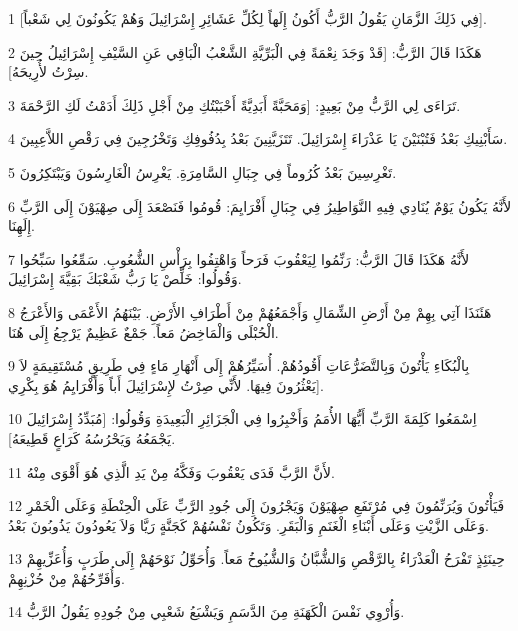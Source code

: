 \par 1 [فِي ذَلِكَ الزَّمَانِ يَقُولُ الرَّبُّ أَكُونُ إِلَهاً لِكُلِّ عَشَائِرِ إِسْرَائِيلَ وَهُمْ يَكُونُونَ لِي شَعْباً].
\par 2 هَكَذَا قَالَ الرَّبُّ: [قَدْ وَجَدَ نِعْمَةً فِي الْبَرِّيَّةِ الشَّعْبُ الْبَاقِي عَنِ السَّيْفِ إِسْرَائِيلُ حِينَ سِرْتُ لأُرِيحَهُ].
\par 3 تَرَاءَى لِي الرَّبُّ مِنْ بَعِيدٍ: [وَمَحَبَّةً أَبَدِيَّةً أَحْبَبْتُكِ مِنْ أَجْلِ ذَلِكَ أَدَمْتُ لَكِ الرَّحْمَةَ.
\par 4 سَأَبْنِيكِ بَعْدُ فَتُبْنَيْنَ يَا عَذْرَاءَ إِسْرَائِيلَ. تَتَزَيَّنِينَ بَعْدُ بِدُفُوفِكِ وَتَخْرُجِينَ فِي رَقْصِ اللاَّعِبِينَ.
\par 5 تَغْرِسِينَ بَعْدُ كُرُوماً فِي جِبَالِ السَّامِرَةِ. يَغْرِسُ الْغَارِسُونَ وَيَبْتَكِرُونَ.
\par 6 لأَنَّهُ يَكُونُ يَوْمٌ يُنَادِي فِيهِ النَّوَاطِيرُ فِي جِبَالِ أَفْرَايِمَ: قُومُوا فَنَصْعَدَ إِلَى صِهْيَوْنَ إِلَى الرَّبِّ إِلَهِنَا.
\par 7 لأَنَّهُ هَكَذَا قَالَ الرَّبُّ: رَنِّمُوا لِيَعْقُوبَ فَرَحاً وَاهْتِفُوا بِرَأْسِ الشُّعُوبِ. سَمِّعُوا سَبِّحُوا وَقُولُوا: خَلِّصْ يَا رَبُّ شَعْبَكَ بَقِيَّةَ إِسْرَائِيلَ.
\par 8 هَئَنَذَا آتِي بِهِمْ مِنْ أَرْضِ الشِّمَالِ وَأَجْمَعُهُمْ مِنْ أَطْرَافِ الأَرْضِ. بَيْنَهُمُ الأَعْمَى وَالأَعْرَجُ الْحُبْلَى وَالْمَاخِضُ مَعاً. جَمْعٌ عَظِيمٌ يَرْجِعُ إِلَى هُنَا.
\par 9 بِالْبُكَاءِ يَأْتُونَ وَبِالتَّضَرُّعَاتِ أَقُودُهُمْ. أُسَيِّرُهُمْ إِلَى أَنْهَارِ مَاءٍ فِي طَرِيقٍ مُسْتَقِيمَةٍ لاَ يَعْثُرُونَ فِيهَا. لأَنِّي صِرْتُ لإِسْرَائِيلَ أَباً وَأَفْرَايِمُ هُوَ بِكْرِي].
\par 10 اِسْمَعُوا كَلِمَةَ الرَّبِّ أَيُّهَا الأُمَمُ وَأَخْبِرُوا فِي الْجَزَائِرِ الْبَعِيدَةِ وَقُولُوا: [مُبَدِّدُ إِسْرَائِيلَ يَجْمَعُهُ وَيَحْرُسُهُ كَرَاعٍ قَطِيعَهُ].
\par 11 لأَنَّ الرَّبَّ فَدَى يَعْقُوبَ وَفَكَّهُ مِنْ يَدِ الَّذِي هُوَ أَقْوَى مِنْهُ.
\par 12 فَيَأْتُونَ وَيُرَنِّمُونَ فِي مُرْتَفَعِ صِهْيَوْنَ وَيَجْرُونَ إِلَى جُودِ الرَّبِّ عَلَى الْحِنْطَةِ وَعَلَى الْخَمْرِ وَعَلَى الزَّيْتِ وَعَلَى أَبْنَاءِ الْغَنَمِ وَالْبَقَرِ. وَتَكُونُ نَفْسُهُمْ كَجَنَّةٍ رَيَّا وَلاَ يَعُودُونَ يَذُوبُونَ بَعْدُ.
\par 13 حِينَئِذٍ تَفْرَحُ الْعَذْرَاءُ بِالرَّقْصِ وَالشُّبَّانُ وَالشُّيُوخُ مَعاً. وَأُحَوِّلُ نَوْحَهُمْ إِلَى طَرَبٍ وَأُعَزِّيهِمْ وَأُفَرِّحُهُمْ مِنْ حُزْنِهِمْ.
\par 14 وَأُرْوِي نَفْسَ الْكَهَنَةِ مِنَ الدَّسَمِ وَيَشْبَعُ شَعْبِي مِنْ جُودِهِ يَقُولُ الرَّبُّ.
